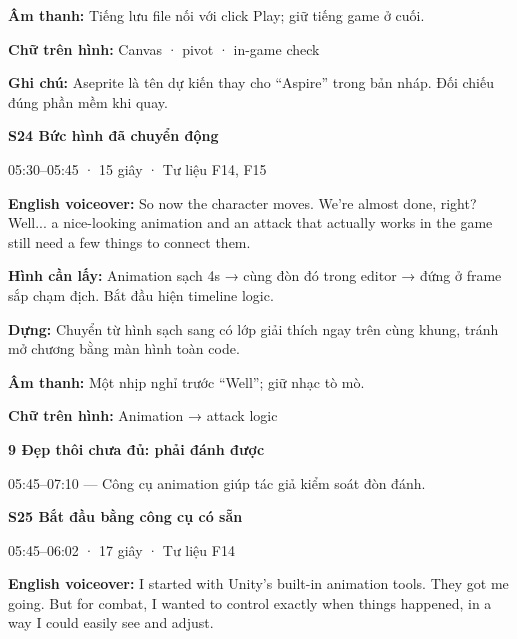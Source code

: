 \documentclass[10pt,a4paper]{article}
\begin{document}
\textbf{Âm thanh:}  Tiếng lưu file nối với click Play; giữ tiếng game ở cuối.\par

\textbf{Chữ trên hình:}  Canvas · pivot · in-game check\par

\textbf{Ghi chú:}  Aseprite là tên dự kiến thay cho “Aspire” trong bản nháp. Đối chiếu đúng phần mềm khi quay.\par

\clearpage

\textbf{S24 Bức hình đã chuyển động}\par

05:30–05:45 · 15 giây · Tư liệu F14, F15\par

\textbf{English voiceover:}  So now the character moves. We’re almost done, right? Well... a nice-looking animation and an attack that actually works in the game still need a few things to connect them.\par

\textbf{Hình cần lấy:}  Animation sạch 4s → cùng đòn đó trong editor → đứng ở frame sắp chạm địch. Bắt đầu hiện timeline logic.\par

\textbf{Dựng:}  Chuyển từ hình sạch sang có lớp giải thích ngay trên cùng khung, tránh mở chương bằng màn hình toàn code.\par

\textbf{Âm thanh:}  Một nhịp nghỉ trước “Well”; giữ nhạc tò mò.\par

\textbf{Chữ trên hình:}  Animation → attack logic\par

\textbf{9 Đẹp thôi chưa đủ: phải đánh được}\par

05:45–07:10 — Công cụ animation giúp tác giả kiểm soát đòn đánh.\par

\textbf{S25 Bắt đầu bằng công cụ có sẵn}\par

05:45–06:02 · 17 giây · Tư liệu F14\par

\textbf{English voiceover:}  I started with Unity’s built-in animation tools. They got me going. But for combat, I wanted to control exactly when things happened, in a way I could easily see and adjust.\par
\end{document}
